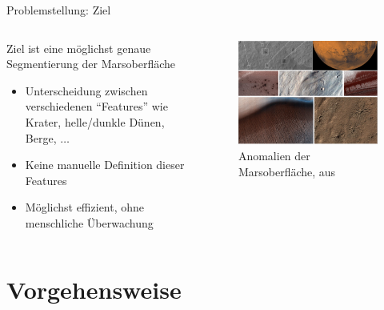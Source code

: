 \documentclass[9pt]{beamer}
\begin{document}
\begin{frame}{Problemstellung: Ziel}
\begin{columns}
	\begin{column}{.4\textwidth}
		Ziel ist eine möglichst genaue Segmentierung der Marsoberfläche
		\begin{itemize}
			\item Unterscheidung zwischen verschiedenen \enquote{Features} wie Krater, helle/dunkle Dünen, Berge, $\ldots$
			\item Keine manuelle Definition dieser Features
			\item Möglichst effizient, ohne menschliche Überwachung
		\end{itemize}
	\end{column}
	\begin{column}{.6\textwidth}
		\begin{figure}[H]
			\includegraphics[width=\textwidth, keepaspectratio]{surface.png}
			\caption{Anomalien der Marsoberfläche, aus \footnotemark[1]}
		\end{figure}
	\end{column}
\end{columns}	
\end{frame}

\section{Vorgehensweise}
\end{document}
